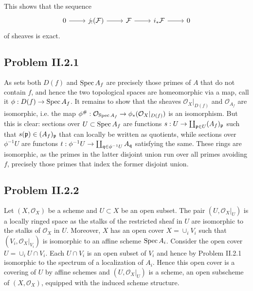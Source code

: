 \documentclass{mathnotes}
\begin{document}
\begin{enumerate}[(a)]
        This shows that the sequence
        \begin{equation*}
            \begin{tikzcd}
                0\ar{r} & j_!(\mathcal{F})\ar{r} & \mathcal{F}\ar{r} & i_*\mathcal{F}\ar{r} & 0
            \end{tikzcd}
        \end{equation*}
        of sheaves is exact.
\end{enumerate}


\subsection*{Problem II.2.1}
As sets both $D(f)$ and $\operatorname{Spec} A_f$ are precisely those primes of $A$ that do not contain $f$,
and hence the two topological spaces are homeomorphic via a map, call it $\phi:D(f)\to\operatorname{Spec} A_f$. It remains to show
that the sheaves $\mathcal{O}_X|_{D(f)}$ and $\mathcal{O}_{A_f}$ are isomorphic, i.e. the map
$\phi^\#:\mathcal{O}_{\operatorname{Spec} A_f}\to\phi_*(\mathcal{O}_X|_{D(f)})$ is an isomorphism. But this is clear:
sections over $U\subset\operatorname{Spec} A_f$ are functions $s:U\to\coprod_{\mathfrak p\in U}(A_f)_{\mathfrak p}$ such that $s(\mathfrak p)\in (A_f)_{\mathfrak p}$
that can locally be written as quotients, while sections over $\phi^{-1}U$ are functons $t:\phi^{-1}U\to\coprod_{\mathfrak q\in\phi^{-1}U}A_{\mathfrak q}$
satisfying the same. These rings are isomorphic, as the primes in the latter disjoint union run over all primes avoiding $f$,
precisely those primes that index the former disjoint union.

\subsection*{Problem II.2.2}
Let $(X,\mathcal{O}_X)$ be a scheme and $U\subset X$ be an open subset. The pair $(U,\mathcal{O}_X|_U)$ is a
locally ringed space as the stalks of the restricted sheaf in $U$ are isomorphic to the stalks of $\mathcal{O}_X$
in $U$. Moreover, $X$ has an open cover $X=\cup_i V_i$ such that $(V_i,\mathcal{O}_X|_{V_i})$ is
isomorphic to an affine scheme $\operatorname{Spec} A_i$. Consider the open cover $U=\cup_i U\cap V_i$. Each $U\cap V_i$ is an open subset
of $V_i$ and hence by Problem II.2.1 isomorphic to the spectrum of a localization of $A_i$. Hence this
open cover is a covering of $U$ by affine schemes and $(U,\mathcal{O}_X|_U)$ is a scheme, an open subscheme of $(X,\mathcal{O}_X)$,
equipped with the induced scheme structure.
\end{document}
